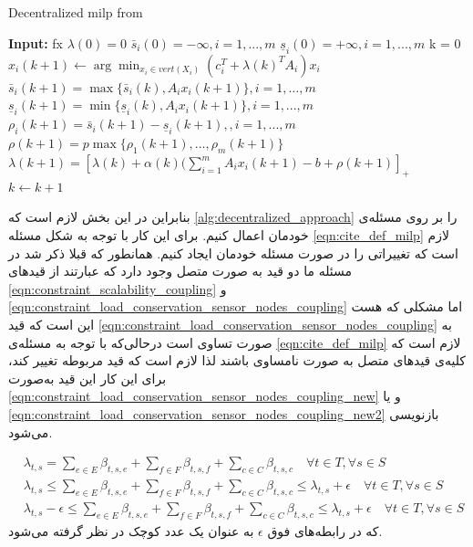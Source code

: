 \begin{latin}
	\begin{algorithm}
		\caption{Decentralized milp from \cite{decentralized_approach}} \label{alg:decentralized_approach}
		\begin{algorithmic}[1]
			\State \textbf{Input:}  fx
			\Procedure{}{}       %
				\State $\lambda(0) = 0$
				\State $\bar{s}_i(0) = -\infty , i = 1,...,m$ 
				\State $\underline{s}_i(0) = +\infty , i = 1,...,m$ 
				\State k = 0
				\Repeat
						\State $x_i(k+1) \gets \arg \displaystyle \min_{x_i \in vert(X_i)} (c_i^T + \lambda(k)^TA_i)x_i$
					\EndFor
					\State $\bar{s}_i(k+1) = \max\{\bar{s}_i(k), A_ix_i(k+1) \} , i = 1, \dots, m$
					\State $\underline{s}_i(k+1) = \min\{\underline{s}_i(k), A_ix_i(k+1) \} , i = 1,...,m$
					\State $\rho_i(k+1) = \bar{s}_i(k+1) - \underline{s}_i(k+1),  , i = 1,...,m$
					\State $\rho(k+1) = p \max \{ \rho_1(k+1), ..., \rho_m(k+1) \}$
					\State $\lambda(k+1) = [\lambda(k) + \alpha(k)(\sum_{i=1}^{m}A_ix_i(k+1)-b+\rho(k+1)]_+$
					\State $k \gets k+1$ 
			\EndProcedure
		\end{algorithmic}
	\end{algorithm}
\end{latin}
	بنابراین در این بخش لازم است که \cref{alg:decentralized_approach} را بر روی مسئله‌ی خودمان اعمال کنیم. برای این کار با توجه به شکل مسئله \cref{eqn:cite_def_milp} لازم است که تغییراتی را در صورت مسئله خودمان ایجاد کنیم. همانطور که قبلا ذکر شد در مسئله ما دو قید به صورت متصل وجود دارد که عبارتند از قیدهای \cref{eqn:constraint_scalability_coupling} و \cref{eqn:constraint_load_conservation_sensor_nodes_coupling} اما مشکلی که هست این است که قید \cref{eqn:constraint_load_conservation_sensor_nodes_coupling} به صورت تساوی است درحالی‌که با توجه به مسئله‌ی \cref{eqn:cite_def_milp} لازم است که کلیه‌ی قیدهای متصل به صورت نامساوی باشند لذا لازم است که قید مربوطه تغییر کند، برای این کار این قید به‌صورت \cref{eqn:constraint_load_conservation_sensor_nodes_coupling_new} و یا \cref{eqn:constraint_load_conservation_sensor_nodes_coupling_new2} بازنویسی می‌شود. 
	
	\begin{subequations}
		\begin{align}
			&\lambda_{t,s} = \sum_{e \in E} \beta_{t,s,e} + \sum_{f \in F} \beta_{t,s,f}
			+\sum_{c \in C}\beta_{t,s,c} \quad \forall{t \in T}, \forall{s \in S} \\
			&\lambda_{t,s} \le \sum_{e \in E} \beta_{t,s,e} + \sum_{f \in F} \beta_{t,s,f}
			+\sum_{c \in C}\beta_{t,s,c} \le \lambda_{t,s}+\epsilon \quad \forall{t \in T}, \forall{s \in S} \label{eqn:constraint_load_conservation_sensor_nodes_coupling_new} \\
			&\lambda_{t,s} - \epsilon \le \sum_{e \in E} \beta_{t,s,e} + \sum_{f \in F} \beta_{t,s,f}
			+\sum_{c \in C}\beta_{t,s,c} \le \lambda_{t,s}+\epsilon \quad \forall{t \in T}, \forall{s \in S}\label{eqn:constraint_load_conservation_sensor_nodes_coupling_new2}
		\end{align}
	\end{subequations}
	که در رابطه‌های فوق $\epsilon$ به عنوان یک عدد کوچک در نظر گرفته می‌شود. 

